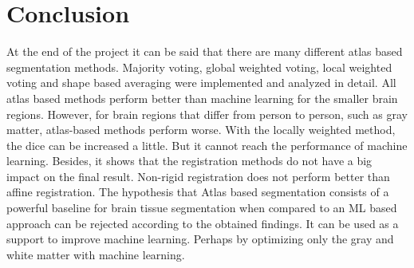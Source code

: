 \section*{Conclusion}
At the end of the project it can be said that there are many different atlas based segmentation methods. Majority voting, global weighted voting, local weighted voting and shape based averaging were implemented and analyzed in detail. All atlas based methods perform better than machine learning for the smaller brain regions. However, for brain regions that differ from person to person, such as gray matter, atlas-based methods perform worse. With the locally weighted method, the dice can be increased a little. But it cannot reach the performance of machine learning. Besides, it shows that the registration methods do not have a big impact on the final result. Non-rigid registration does not perform better than affine registration. The hypothesis that Atlas based segmentation consists of a powerful baseline for brain tissue segmentation when compared to an ML based approach can be rejected according to the obtained findings. It can be used as a support to improve machine learning. Perhaps by optimizing only the gray and white matter with machine learning.